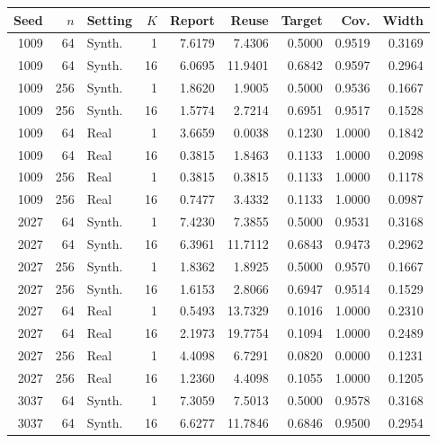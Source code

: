 \documentclass{article}
\begin{document}
\begin{center}
\small
{}
\label{tab:seed}
\begin{longtable}{rrlrrrrrr}\toprule
Seed & $n$ & Setting & $K$ & Report & Reuse & Target & Cov. & Width\\\midrule\endhead
1009 & 64 & Synth. & 1 & 7.6179 & 7.4306 & 0.5000 & 0.9519 & 0.3169\\
1009 & 64 & Synth. & 16 & 6.0695 & 11.9401 & 0.6842 & 0.9597 & 0.2964\\
1009 & 256 & Synth. & 1 & 1.8620 & 1.9005 & 0.5000 & 0.9536 & 0.1667\\
1009 & 256 & Synth. & 16 & 1.5774 & 2.7214 & 0.6951 & 0.9517 & 0.1528\\
1009 & 64 & Real & 1 & 3.6659 & 0.0038 & 0.1230 & 1.0000 & 0.1842\\
1009 & 64 & Real & 16 & 0.3815 & 1.8463 & 0.1133 & 1.0000 & 0.2098\\
1009 & 256 & Real & 1 & 0.3815 & 0.3815 & 0.1133 & 1.0000 & 0.1178\\
1009 & 256 & Real & 16 & 0.7477 & 3.4332 & 0.1133 & 1.0000 & 0.0987\\
2027 & 64 & Synth. & 1 & 7.4230 & 7.3855 & 0.5000 & 0.9531 & 0.3168\\
2027 & 64 & Synth. & 16 & 6.3961 & 11.7112 & 0.6843 & 0.9473 & 0.2962\\
2027 & 256 & Synth. & 1 & 1.8362 & 1.8925 & 0.5000 & 0.9570 & 0.1667\\
2027 & 256 & Synth. & 16 & 1.6153 & 2.8066 & 0.6947 & 0.9514 & 0.1529\\
2027 & 64 & Real & 1 & 0.5493 & 13.7329 & 0.1016 & 1.0000 & 0.2310\\
2027 & 64 & Real & 16 & 2.1973 & 19.7754 & 0.1094 & 1.0000 & 0.2489\\
2027 & 256 & Real & 1 & 4.4098 & 6.7291 & 0.0820 & 0.0000 & 0.1231\\
2027 & 256 & Real & 16 & 1.2360 & 4.4098 & 0.1055 & 1.0000 & 0.1205\\
3037 & 64 & Synth. & 1 & 7.3059 & 7.5013 & 0.5000 & 0.9578 & 0.3168\\
3037 & 64 & Synth. & 16 & 6.6277 & 11.7846 & 0.6846 & 0.9500 & 0.2954\\

\end{longtable}
\end{center}
\end{document}

